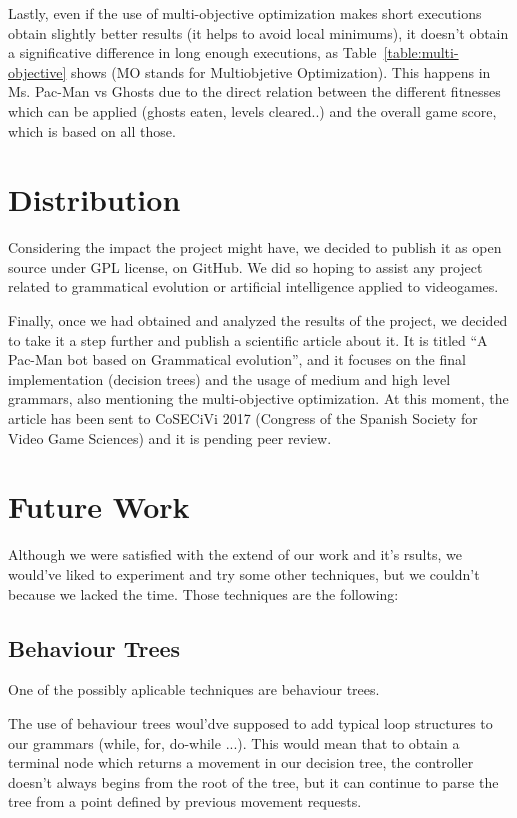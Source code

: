 Lastly, even if the use of multi-objective optimization makes short executions obtain slightly better results (it helps to avoid local minimums), it doesn’t obtain a significative difference in long enough executions, as Table~\ref{table:multi-objective} shows (MO stands for Multiobjetive Optimization). This happens in Ms. Pac-Man vs Ghosts due to the direct relation between the different fitnesses which can be applied (ghosts eaten, levels cleared..) and the overall game score, which is based on all those.

\section{Distribution}
Considering the impact the project might have, we decided to publish it as open source under GPL \cite{licenseThesisGit} license, on GitHub. We did so hoping to assist any project related to grammatical evolution or artificial intelligence applied to videogames. 

Finally, once we had obtained and analyzed the results of the project, we decided to take it a step further and publish a scientific article about it. It is titled ``A Pac-Man bot based on Grammatical evolution'', and it focuses on the final implementation (decision trees) and the usage of medium and high level grammars, also mentioning the multi-objective optimization. At this moment, the article has been sent to CoSECiVi 2017 (Congress of the Spanish Society for Video Game Sciences) and it is pending peer review.

\section{Future Work}
Although we were satisfied with the extend of our work and it's rsults, we would've liked to experiment and try some other techniques, but we couldn't because we lacked the time. Those techniques are the following:

\subsection{Behaviour Trees}
One of the possibly aplicable techniques are behaviour trees.

The use of behaviour trees woul'dve supposed to add typical loop structures to our grammars (while, for, do-while ...). This would mean that to obtain a terminal node which returns a movement in our decision tree, the controller doesn't always begins from the root of the tree, but it can continue to parse the tree from a point defined by previous movement requests.

